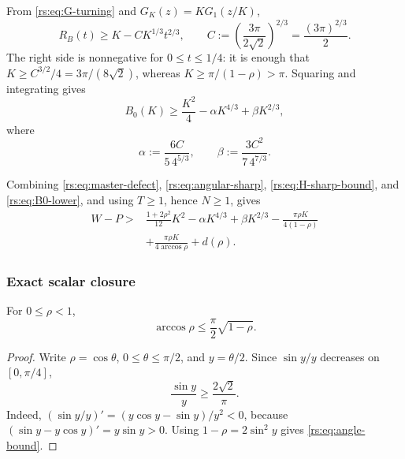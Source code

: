 From \eqref{rs:eq:G-turning} and $G_K(z)=KG_1(z/K)$,
\begin{equation}
 R_B(t)\geq K-C K^{1/3}t^{2/3},
 \qquad
 C:=\left(\frac{3\pi}{2\sqrt2}\right)^{2/3}
   =\frac{(3\pi)^{2/3}}2.
 \label{rs:eq:ball-inverse}
\end{equation}
The right side is nonnegative for $0\leq t\leq1/4$: it is enough that
$K\geq C^{3/2}/4=3\pi/(8\sqrt2)$, whereas
$K\geq\pi/(1-\rho)>\pi$.  Squaring and integrating gives
\begin{equation}
 B_0(K)\geq\frac{K^2}{4}-\alpha K^{4/3}+\beta K^{2/3},
 \label{rs:eq:B0-lower}
\end{equation}
where
\begin{equation}
 \alpha:=\frac{6C}{5\,4^{5/3}},
 \qquad
 \beta:=\frac{3C^2}{7\,4^{7/3}}.
 \label{rs:eq:alpha-beta}
\end{equation}

Combining \eqref{rs:eq:master-defect},
\eqref{rs:eq:angular-sharp}, \eqref{rs:eq:H-sharp-bound}, and
\eqref{rs:eq:B0-lower}, and using $T\geq1$, hence $N\geq1$, gives
\begin{equation}
 \begin{aligned}
 W-P>{}&\frac{1+2\rho^2}{12}K^2
 -\alpha K^{4/3}+\beta K^{2/3}
 -\frac{\pi\rho K}{4(1-\rho)}\\
 &+\frac{\pi\rho K}{4\arccos\rho}+d(\rho).
 \end{aligned}
 \label{rs:eq:pre-scalar-gap}
\end{equation}

\subsubsection*{Exact scalar closure}

\begin{lemma}
\label{rs:lem:angle}
For $0\leq\rho<1$,
\begin{equation}
 \arccos\rho\leq\frac\pi2\sqrt{1-\rho}.
 \label{rs:eq:angle-bound}
\end{equation}
\end{lemma}

\begin{proof}
Write $\rho=\cos\theta$, $0\leq\theta\leq\pi/2$, and
$y=\theta/2$.  Since $\sin y/y$ decreases on $[0,\pi/4]$,
\[
 \frac{\sin y}{y}\geq\frac{2\sqrt2}{\pi}.
\]
Indeed,
$(\sin y/y)'=(y\cos y-\sin y)/y^2<0$, because
$(\sin y-y\cos y)'=y\sin y>0$.
Using $1-\rho=2\sin^2y$ gives \eqref{rs:eq:angle-bound}.
\end{proof}

